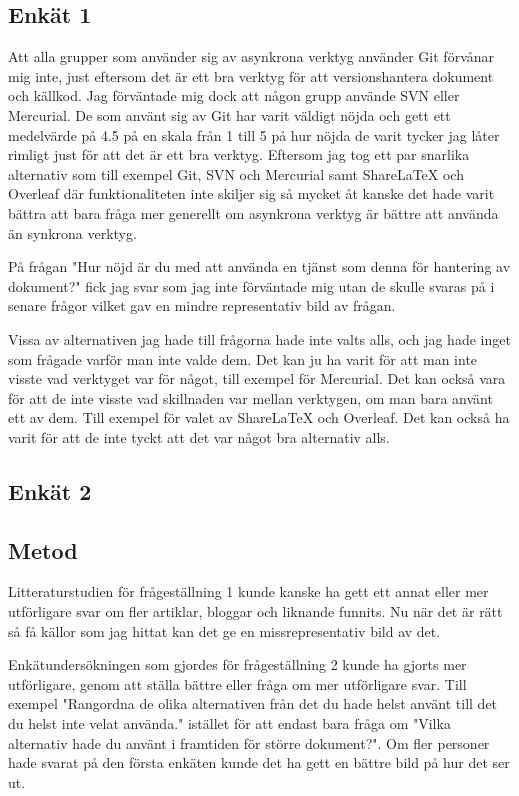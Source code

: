 \subsection{Enkät 1}

Att alla grupper som använder sig av asynkrona verktyg använder Git förvånar mig inte, just eftersom det är ett bra verktyg för att versionshantera dokument och källkod. Jag förväntade mig dock att någon grupp använde SVN eller Mercurial. De som använt sig av Git har varit väldigt nöjda och gett ett medelvärde på 4.5 på en skala från 1 till 5 på hur nöjda de varit tycker jag låter rimligt just för att det är ett bra verktyg. Eftersom jag tog ett par snarlika alternativ som till exempel Git, SVN och Mercurial samt ShareLaTeX och Overleaf där funktionaliteten inte skiljer sig så mycket åt kanske det hade varit bättra att bara fråga mer generellt om asynkrona verktyg är bättre att använda än synkrona verktyg.

På frågan "Hur nöjd är du med att använda en tjänst som denna för hantering av dokument?" fick jag svar som jag inte förväntade mig utan de skulle svaras på i senare frågor vilket gav en mindre representativ bild av frågan.

Vissa av alternativen jag hade till frågorna hade inte valts alls, och jag hade inget som frågade varför man inte valde dem. Det kan ju ha varit för att man inte visste vad verktyget var för något, till exempel för Mercurial. Det kan också vara för att de inte visste vad skillnaden var mellan verktygen, om man bara använt ett av dem. Till exempel för valet av ShareLaTeX och Overleaf. Det kan också ha varit för att de inte tyckt att det var något bra alternativ alls. 


\subsection{Enkät 2}

\subsection{Metod}
Litteraturstudien för frågeställning 1 kunde kanske ha gett ett annat eller mer utförligare svar om fler artiklar, bloggar och liknande funnits. Nu när det är rätt så få källor som jag hittat kan det ge en missrepresentativ bild av det.

Enkätundersökningen som gjordes för frågeställning 2 kunde ha gjorts mer utförligare, genom att ställa bättre eller fråga om mer utförligare svar. Till exempel "Rangordna de olika alternativen från det du hade helst använt till det du helst inte velat använda." istället för att endast bara fråga om "Vilka alternativ hade du använt i framtiden för större dokument?". Om fler personer hade svarat på den första enkäten kunde det ha gett en bättre bild på hur det ser ut.

